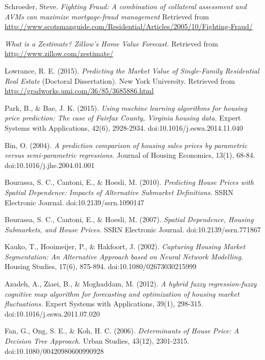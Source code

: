 \documentclass[letter,10pt]{article}
\begin{document}
\begin{multicols}{2}
\begin{thebibliography}{9}
			Schroeder, Steve.
			\textit{Fighting Fraud: A combination of collateral assessment and AVMs can maximize mortgage-fraud management}
			Retrieved from \\ \small{\url{http://www.scotsmanguide.com/Residential/Articles/2005/10/Fighting-Fraud/}}
			
			\textit{What is a Zestimate? Zillow's Home Value Forecast.}
			Retrieved from \\
			\small{\url{http://www.zillow.com/zestimate/}}
			
			Lowrance, R. E. (2015).
			\textit{Predicting the Market Value of Single-Family Residential Real Estate}
			(Doctoral Dissertation). New York University. Retrieved from \small{\url{http://gradworks.umi.com/36/85/3685886.html}}
			
			Park, B., \& Bae, J. K. (2015).
			\textit{Using machine learning algorithms for housing price prediction: The case of Fairfax County, Virginia housing data.}
			Expert Systems with Applications, 42(6), 2928-2934. doi:10.1016/j.eswa.2014.11.040
			
			Bin, O. (2004).
			\textit{A prediction comparison of housing sales prices by parametric versus semi-parametric regressions.}
			Journal of Housing Economics, 13(1), 68-84. doi:10.1016/j.jhe.2004.01.001
			
			Bourassa, S. C., Cantoni, E., \& Hoesli, M. (2010). 
			\textit{Predicting House Prices with Spatial Dependence: Impacts of Alternative Submarket Definitions.}
			SSRN Electronic Journal. doi:10.2139/ssrn.1090147
			
			Bourassa, S. C., Cantoni, E., \& Hoesli, M. (2007).
			\textit{Spatial Dependence, Housing Submarkets, and House Prices.}
			SSRN Electronic Journal. doi:10.2139/ssrn.771867
			
			Kauko, T., Hooimeijer, P., \& Hakfoort, J. (2002).
			\textit{Capturing Housing Market Segmentation: An Alternative Approach based on Neural Network Modelling.}
			Housing Studies, 17(6), 875-894. doi:10.1080/02673030215999
			
			Azadeh, A., Ziaei, B., \& Moghaddam, M. (2012).
			\textit{A hybrid fuzzy regression-fuzzy cognitive map algorithm for forecasting and optimization of housing market fluctuations.}
			Expert Systems with Applications, 39(1), 298-315. doi:10.1016/j.eswa.2011.07.020
			
			Fan, G., Ong, S. E., \& Koh, H. C. (2006).
			\textit{Determinants of House Price: A Decision Tree Approach.}
			Urban Studies, 43(12), 2301-2315. doi:10.1080/00420980600990928
		\end{thebibliography}
	\end{multicols}
\end{document}
